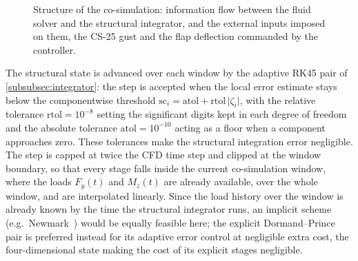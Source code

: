 \begin{figure}[t]
    \centering
    \scalebox{0.92}{}
    \caption{Structure of the co-simulation: information flow between the fluid solver and the structural integrator, and the external inputs imposed on them, the CS-25 gust and the flap deflection commanded by the controller.}
    \label{fig:fsi_scheme}
\end{figure}

The structural state is advanced over each window by the adaptive RK45 pair of \cref{subsubsec:integrator}: the step is accepted when the local error estimate stays below the componentwise threshold $\mathrm{sc}_i = \mathrm{atol} + \mathrm{rtol}\,\lvert \zeta_i\rvert$, with the relative tolerance $\mathrm{rtol}=10^{-8}$ setting the significant digits kept in each degree of freedom and the absolute tolerance $\mathrm{atol}=10^{-10}$ acting as a floor when a component approaches zero. These tolerances make the structural integration error negligible. The step is capped at twice the CFD time step and clipped at the window boundary, so that every stage falls inside the current co-simulation window, where the loads $F_y(t)$ and $M_z(t)$ are already available, over the whole window, and are interpolated linearly. Since the load history over the window is already known by the time the structural integrator runs, an implicit scheme (e.g.\ Newmark~\cite{newmark1959}) would be equally feasible here; the explicit Dormand--Prince pair is preferred instead for its adaptive error control at negligible extra cost, the four-dimensional state making the cost of its explicit stages negligible.

